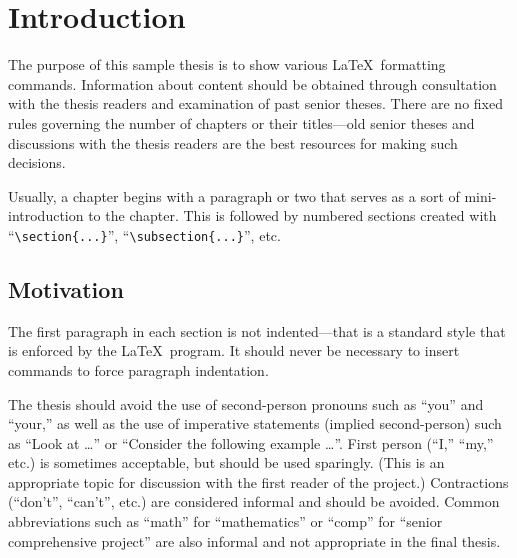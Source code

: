 %
%

\chapter{Introduction}\label{ch:intro} %

The purpose of this sample thesis is to show various \LaTeX\ formatting
commands. Information about content should be obtained through consultation
with the thesis readers and examination of past senior theses.
There are no fixed rules governing the number of chapters or their titles---old 
senior theses and discussions with the thesis readers are the best resources
for making such decisions.

Usually, a chapter begins with a paragraph or two that serves as a
sort of mini-introduction to the chapter. This is followed 
by numbered sections created with ``\verb$\section{...}$'', 
``\verb$\subsection{...}$'', etc.

\section{Motivation} \label{sec:motivation}
The first paragraph in each section is not indented---that is a standard style
that is enforced by the \LaTeX\ program. It should never be necessary to
insert commands to force paragraph indentation.

The thesis should avoid the use of second-person pronouns such as ``you''
and ``your,'' as well as the use of imperative statements (implied
second-person) such as ``Look
at \ldots'' or ``Consider the following example \ldots''. 
First person (``I,'' ``my,'' etc.) is sometimes acceptable, 
but should be used sparingly. (This is an appropriate topic 
for discussion with the first reader of the project.) Contractions (``don't'',
``can't'', etc.) are considered informal and should be avoided. Common
abbreviations such as ``math'' for ``mathematics'' or ``comp'' for 
``senior comprehensive project''  are also informal and not appropriate
in the final thesis.

